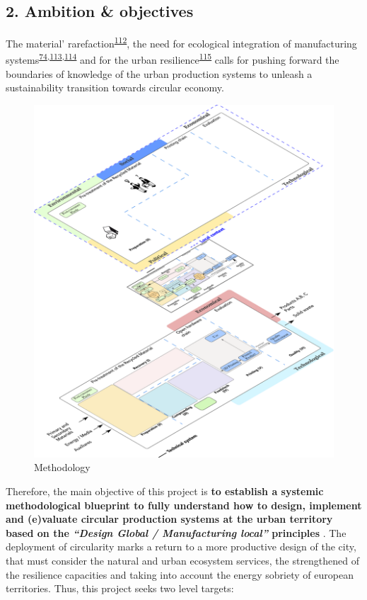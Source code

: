 \documentclass[
  12pt,
  a4paperpaper,
  onecolumn]{article}
\begin{document}
\hypertarget{ambition-objectives}{%
\subsection{2. Ambition \& objectives}\label{ambition-objectives}}

The material'
rarefaction\textsuperscript{\protect\hyperlink{ref-hultman2021}{112}},
the need for ecological integration of manufacturing
systems\textsuperscript{\protect\hyperlink{ref-Bakshi2019a}{74},\protect\hyperlink{ref-Bakshi2015}{113},\protect\hyperlink{ref-Saladini2018}{114}}
and for the urban
resilience\textsuperscript{\protect\hyperlink{ref-xu2021e}{115}} calls
for pushing forward the boundaries of knowledge of the urban production
systems to unleash a sustainability transition towards circular economy.

\begin{figure}
\centering
    \includegraphics[width=\linewidth]{Figures/Levels.png}
    \caption{Methodology}
    \label{fig:WPs}
\end{figure}

Therefore, the main objective of this project is \textbf{to establish a
systemic methodological blueprint to fully understand how to design,
implement and (e)valuate circular production systems at the urban
territory based on the \emph{``Design Global / Manufacturing local''}
principles }. The deployment of circularity marks a return to a more
productive design of the city, that must consider the natural and urban
ecosystem services, the strengthened of the resilience capacities and
taking into account the energy sobriety of european territories. Thus,
this project seeks two level targets:
\end{document}
